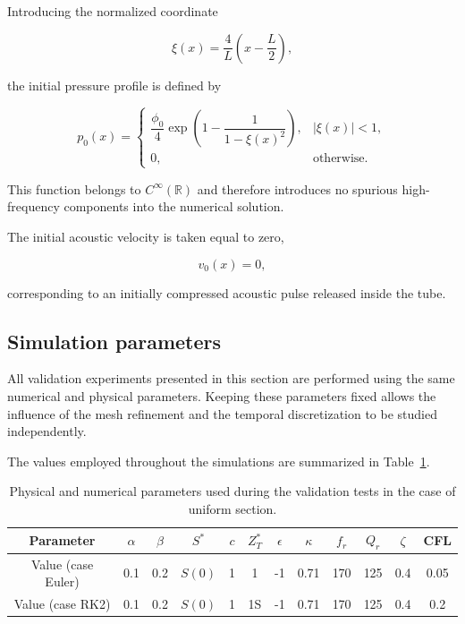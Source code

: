 \documentclass[11pt,a4paper]{report}
\theoremstyle{plain}
\theoremstyle{definition}
\begin{document}
Introducing the normalized coordinate

\begin{equation}
\xi(x)
=
\frac{4}{L}
\left(
x-\frac{L}{2}
\right),
\end{equation}

the initial pressure profile is defined by

\begin{equation}
p_0(x)=
\begin{cases}
\dfrac{\phi_0}{4}
\exp
\left(
1-
\dfrac{1}{1-\xi(x)^2}
\right),
&
|\xi(x)|<1,
\\[1.2em]
0,
&
\text{otherwise.}
\end{cases}
\end{equation}

This function belongs to \(C^\infty(\mathbb{R})\) and therefore introduces no
spurious high-frequency components into the numerical solution.

The initial acoustic velocity is taken equal to zero,

\begin{equation}
v_0(x)=0,
\end{equation}

corresponding to an initially compressed acoustic pulse released inside the
tube.

%
%


\subsection{Simulation parameters}

All validation experiments presented in this section are performed using the
same numerical and physical parameters. Keeping these parameters fixed allows
the influence of the mesh refinement and the temporal discretization to be
studied independently.

The values employed throughout the simulations are summarized in
Table~\ref{tab:validation_parameters_unif_sect}.

\begin{table}[htbp]
\centering
\begin{tabular}{cccccccccccc}
\toprule
Parameter
&
$\alpha$
&
$\beta$
&
$S^\ast$
&
$c$
&
$Z_T^\ast$
&
$\epsilon$
&
$\kappa$
&
$f_r$
&
$Q_r$
&
$\zeta$
&
CFL
\\
\midrule
Value (case Euler)
&
0.1
&
0.2
&
$S(0)$
&
1
&
1
&
-1
&
0.71
&
170
&
125
&
0.4
&
0.05
\\
\midrule
Value (case RK2)
&
0.1
&
0.2
&
$S(0)$
&
1
&
1S
&
-1
&
0.71
&
170
&
125
&
0.4
&
0.2
\\
\bottomrule
\end{tabular}
\caption{Physical and numerical parameters used during the validation tests in the case of 
uniform section.}
\label{tab:validation_parameters_unif_sect}
\end{table}
\end{document}

